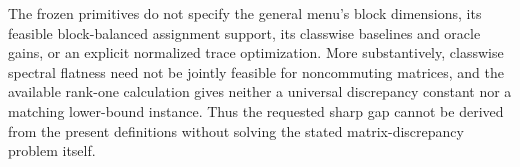 The frozen primitives do not specify the general menu's block dimensions, its feasible block-balanced assignment support, its classwise baselines and oracle gains, or an explicit normalized trace optimization. More substantively, classwise spectral flatness need not be jointly feasible for noncommuting matrices, and the available rank-one calculation gives neither a universal discrepancy constant nor a matching lower-bound instance. Thus the requested sharp gap cannot be derived from the present definitions without solving the stated matrix-discrepancy problem itself.